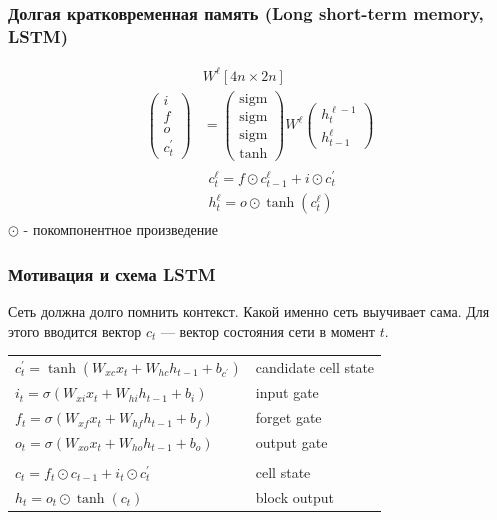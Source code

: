 \documentclass[fullscreen=true, bookmarks=true, hyperref={pdfencoding=unicode}]{beamer}
\begin{document}
\begin{frame}[t]
  \frametitle{Долгая кратковременная память (Long short-term memory, LSTM)}

  \begin{align*}
     &W^\ell [4n\times 2n] \\
    \left(\begin{array}{c}
    i \\ f \\ o \\ c_t^\prime
    \end{array}\right) &=
    \left(\begin{array}{c}
    \text{sigm} \\ \text{sigm} \\ \text{sigm} \\ \tanh
    \end{array}\right)
    W^\ell
    \left(\begin{array}{c}
    h_t^{\ell-1} \\ h_{t-1}^{\ell}
    \end{array}\right) \\
    &\begin{array}{l}
    c_t^\ell = f \odot c_{t-1}^\ell + i \odot c_t^\prime \\
    h_t^\ell = o \odot \tanh(c_t^\ell)
    \end{array}
  \end{align*}
  \center $\odot$ - покомпонентное произведение
\end{frame}


\begin{frame}
  \frametitle{Мотивация и схема LSTM}

  Сеть должна долго помнить контекст. Какой именно сеть выучивает сама.
  Для этого вводится вектор $c_t$ — вектор состояния сети в момент $t$.

  \vspace{1cm}
  \begin{tabular}{ll}
    $c_t^\prime = \tanh(W_{xc}x_t + W_{hc}h_{t-1} + b_{c^\prime})$ & candidate cell state \\
    $i_t = \sigma(W_{xi}x_t + W_{hi}h_{t-1} + b_{i})$ & input gate \\
    $f_t = \sigma(W_{xf}x_t + W_{hf}h_{t-1} + b_{f})$ & forget gate \\
    $o_t = \sigma(W_{xo}x_t + W_{ho}h_{t-1} + b_{o})$ & output gate \\
     & \\
    $c_t = f_t \odot c_{t-1} + i_t \odot c_t^\prime$ & cell state \\
    $h_t = o_t \odot \tanh(c_t)$ & block output
  \end{tabular}
\end{frame}
\end{document}
